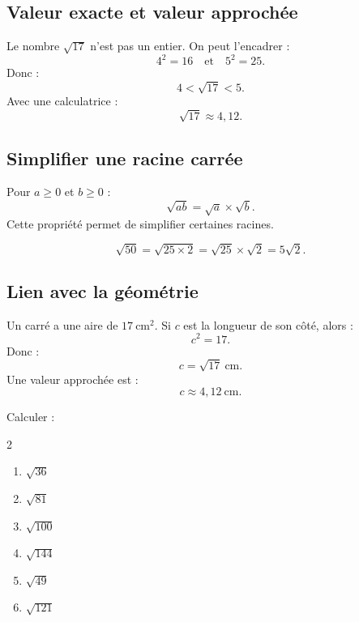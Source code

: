 \documentclass[11pt,a4paper]{article}
\newcounter{exercice}
\begin{document}
\subsection{Valeur exacte et valeur approchée}

\begin{exemple}
Le nombre $\sqrt{17}$ n'est pas un entier. On peut l'encadrer :
\[
4^2=16
\quad \text{et} \quad
5^2=25.
\]
Donc :
\[
4<\sqrt{17}<5.
\]
Avec une calculatrice :
\[
\sqrt{17}\approx4{,}12.
\]
\end{exemple}

\subsection{Simplifier une racine carrée}

\begin{propriete}
Pour $a\geq0$ et $b\geq0$ :
\[
\sqrt{ab}=\sqrt a \times \sqrt b.
\]
Cette propriété permet de simplifier certaines racines.
\end{propriete}

\begin{exemple}
\[
\sqrt{50}=\sqrt{25\times2}=\sqrt{25}\times\sqrt2=5\sqrt2.
\]
\end{exemple}

\subsection{Lien avec la géométrie}

\begin{exemple}
Un carré a une aire de $17\ \text{cm}^2$. Si $c$ est la longueur de son côté, alors :
\[
c^2=17.
\]
Donc :
\[
c=\sqrt{17}\ \text{cm}.
\]
Une valeur approchée est :
\[
c\approx4{,}12\ \text{cm}.
\]
\end{exemple}

\begin{exercice}
Calculer :
\begin{multicols}{2}
\begin{enumerate}[label=\alph*)]
  \item $\sqrt{36}$
  \item $\sqrt{81}$
  \item $\sqrt{100}$
  \item $\sqrt{144}$
  \item $\sqrt{49}$
  \item $\sqrt{121}$
\end{enumerate}
\end{multicols}
\end{exercice}
\end{document}
